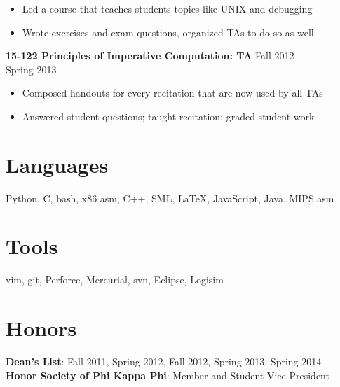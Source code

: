 \documentclass[margin]{res}
\begin{document}
\begin{resume}
  \vspace{-1em}\vspace{-1ex}
  \begin{itemize} \itemsep -2pt
    \item Led a course that teaches students topics like UNIX and debugging
    \item Wrote exercises and exam questions, organized TAs to do so as well
  \end{itemize}

  \textbf{15-122 Principles of Imperative Computation: TA}
    \hfill Fall 2012\\ \hphantom{1em} \hfill Spring 2013

  \vspace{-1em}\vspace{-1ex}
  \begin{itemize} \itemsep -2pt
    \item Composed handouts for every recitation that are now used by all TAs
    \item Answered student questions; taught recitation; graded student work
  \end{itemize}

\section{Languages}
  Python, C, bash, x86 asm, C++, SML, \LaTeX, JavaScript, Java, MIPS asm

\section{Tools}
  vim, git, Perforce, Mercurial, svn, Eclipse, Logisim

\section{Honors}
  \textbf{Dean's List}: Fall 2011, Spring 2012, Fall 2012, Spring 2013, Spring 2014 \\
  \textbf{Honor Society of Phi Kappa Phi}: Member and Student Vice President

\end{resume}
\end{document}
